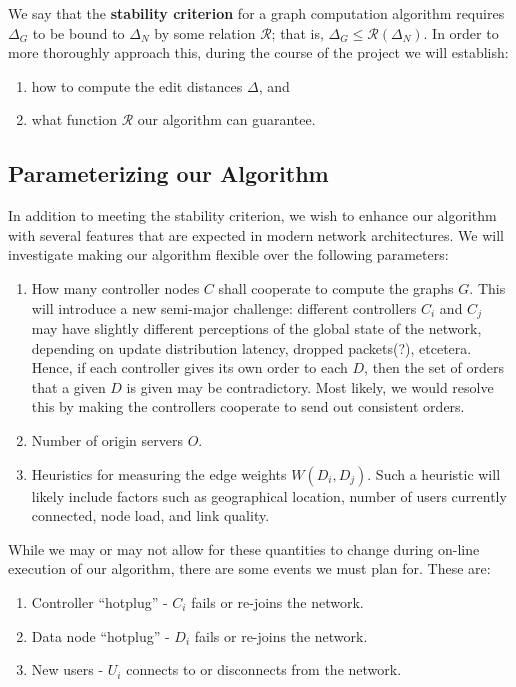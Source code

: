 We say that the {\bf stability criterion} for a graph computation algorithm requires $\Delta_G$ to be bound to $\Delta_N$ by some relation $\mathcal{R}$; that is, $\Delta_G \le \mathcal{R}(\Delta_N)$. In order to more thoroughly approach this, during the course of the project we will establish:
\begin{enumerate}
	\item how to compute the edit distances $\Delta$, and 
	\item what function $\mathcal{R}$ our algorithm can guarantee.
\end{enumerate}

\subsection{Parameterizing our Algorithm}

In addition to meeting the stability criterion, we wish to enhance our algorithm with several features that are expected in modern network architectures. We will investigate making our algorithm flexible over the following parameters:

\begin{enumerate}
	\item How many controller nodes $C$ shall cooperate to compute the graphs $G$. This will introduce a new semi-major challenge: different controllers $C_i$ and $C_j$ may have slightly different perceptions of the global state of the network, depending on update distribution latency, dropped packets(?), etcetera. Hence, if each controller gives its own order to each $D$, then the set of orders that a given $D$ is given may be contradictory. Most likely, we would resolve this by making the controllers cooperate to send out consistent orders.
	\item Number of origin servers $O$.
	\item Heuristics for measuring the edge weights $W(D_i,D_j)$. Such a heuristic will likely include factors such as geographical location, number of users currently connected, node load, and link quality.
\end{enumerate}

While we may or may not allow for these quantities to change during on-line execution of our algorithm, there are some events we must plan for. These are:

\begin{enumerate}
	\item Controller ``hotplug'' - $C_i$ fails or re-joins the network.
	\item Data node ``hotplug'' - $D_i$ fails or re-joins the network.
	\item New users - $U_i$ connects to or disconnects from the network.
\end{enumerate}

